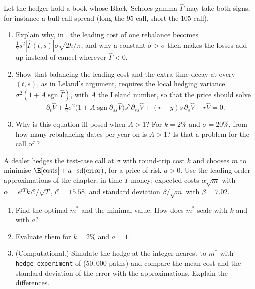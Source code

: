 \begin{exercise}\label{ex:hd-nonconvex}
\medium Let the hedger hold a book whose Black--Scholes gamma $\hat\Gamma$ may take both signs, for
instance a bull call spread (long the $95$ call, short the $105$ call).
\begin{enumerate}[label=(\alph*)]
  \item Explain why, in , the leading cost of one rebalance becomes
    $\frac12s^2|\hat\Gamma(t,s)|\sigma\sqrt{2h/\pi}$, and why a constant $\hat\sigma>\sigma$ then makes the losses
    add up instead of cancel wherever $\hat\Gamma<0$.
  \item Show that balancing the leading cost and the extra time decay at every $(t,s)$, as in
    Leland's argument, requires the local hedging variance $\sigma^2(1+A\operatorname{sgn}\hat\Gamma)$, with $A$
    the Leland number, so that the price should solve
    \[
      \partial_t\hat V+\tfrac12\sigma^2\big(1+A\operatorname{sgn}\partial_{ss}\hat V\big)s^2\partial_{ss}\hat V+(r-y)s\,\partial_s\hat V-r\hat V=0 .
    \]
  \item Why is this equation ill-posed when $A>1$? For $k=2\%$ and $\sigma=20\%$, from how many
    rebalancing dates per year on is $A>1$? Is that a problem for the call of
    ?
\end{enumerate}
\end{exercise}

\begin{exercise}\label{ex:hd-tradeoff}
\easy A dealer hedges the test-case call at $\sigma$ with round-trip cost $k$ and chooses $m$ to
minimise $\E[\text{costs}]+a\cdot\mathrm{sd}(\text{error})$, for a price of risk $a>0$. Use the
leading-order approximations of the chapter, in time-$T$ money: expected costs $\alpha\sqrt m$ with
$\alpha=e^{rT}k\,\mathcal C/\sqrt T$, $\mathcal C=15.58$, and standard deviation $\beta/\sqrt m$ with $\beta=7.02$.
\begin{enumerate}[label=(\alph*)]
  \item Find the optimal $m^*$ and the minimal value. How does $m^*$ scale with $k$ and with
    $a$?
  \item Evaluate them for $k=2\%$ and $a=1$.
  \item (Computational.) Simulate the hedge at the integer nearest to $m^*$ with
    \texttt{hedge\_experiment} of  ($50{,}000$ paths) and compare
    the mean cost and the standard deviation of the error with the approximations. Explain the
    differences.
\end{enumerate}
\end{exercise}

